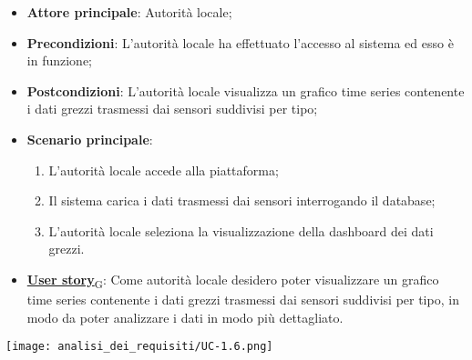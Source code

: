 \begin{itemize}
	\item \textbf{Attore principale}: Autorità locale;
	\item \textbf{Precondizioni}: L'autorità locale ha effettuato l'accesso al sistema ed esso è in funzione;
	\item \textbf{Postcondizioni}: L'autorità locale visualizza un grafico time series contenente i dati grezzi trasmessi dai sensori suddivisi per tipo;
	\item \textbf{Scenario principale}:
	      \begin{enumerate}
		      \item L'autorità locale accede alla piattaforma;
		      \item Il sistema carica i dati trasmessi dai sensori interrogando il database;
		      \item L'autorità locale seleziona la visualizzazione della dashboard dei dati grezzi.
	      \end{enumerate}
	\item \href{https://7last.github.io/docs/rtb/documentazione-interna/glossario\#user-story}{\textbf{User story}\textsubscript{G}}:
	      Come autorità locale desidero poter visualizzare un grafico time series contenente i dati grezzi trasmessi dai sensori suddivisi per tipo, in modo da poter analizzare i dati in modo più dettagliato.
\end{itemize}
\begin{center}
	\texttt{[image: analisi\_dei\_requisiti/UC-1.6.png]}
\end{center}

